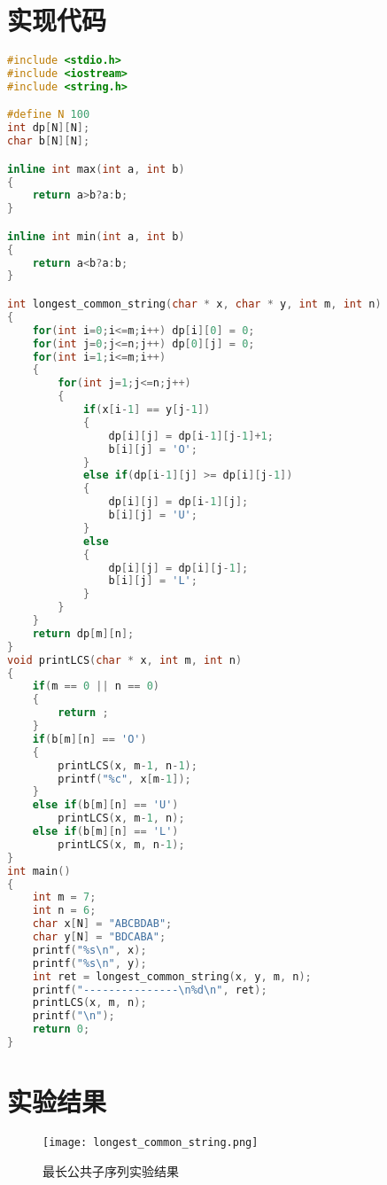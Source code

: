 \documentclass[11pt]{ctexart}
\begin{document}
\section{实现代码}
\begin{lstlisting}[language=C++]
#include <stdio.h>
#include <iostream>
#include <string.h>

#define N 100
int dp[N][N];
char b[N][N];

inline int max(int a, int b)
{
	return a>b?a:b;
}

inline int min(int a, int b)
{
	return a<b?a:b;
}

int longest_common_string(char * x, char * y, int m, int n)
{
	for(int i=0;i<=m;i++) dp[i][0] = 0;
	for(int j=0;j<=n;j++) dp[0][j] = 0;
	for(int i=1;i<=m;i++)
	{
		for(int j=1;j<=n;j++)
		{
			if(x[i-1] == y[j-1])
			{
				dp[i][j] = dp[i-1][j-1]+1;
				b[i][j] = 'O';
			}
			else if(dp[i-1][j] >= dp[i][j-1])
			{
				dp[i][j] = dp[i-1][j];
				b[i][j] = 'U';
			}
			else
			{
				dp[i][j] = dp[i][j-1];
				b[i][j] = 'L';
			}
		}
	}
	return dp[m][n];
}
void printLCS(char * x, int m, int n)
{
	if(m == 0 || n == 0)	
	{
		return ;
	}
	if(b[m][n] == 'O')
	{
		printLCS(x, m-1, n-1);
		printf("%c", x[m-1]);
	}
	else if(b[m][n] == 'U')
		printLCS(x, m-1, n);
	else if(b[m][n] == 'L')
		printLCS(x, m, n-1);
}
int main()
{
	int m = 7;
	int n = 6;
	char x[N] = "ABCBDAB";
	char y[N] = "BDCABA";
	printf("%s\n", x);
	printf("%s\n", y);
	int ret = longest_common_string(x, y, m, n);
	printf("---------------\n%d\n", ret);
	printLCS(x, m, n);
	printf("\n");
	return 0;
}
\end{lstlisting}

\section{实验结果}
\begin{figure}[H]
\centering
\texttt{[image: longest\_common\_string.png]}
\caption{最长公共子序列实验结果}
\label{Label_LCS}
\end{figure}
\end{document}
